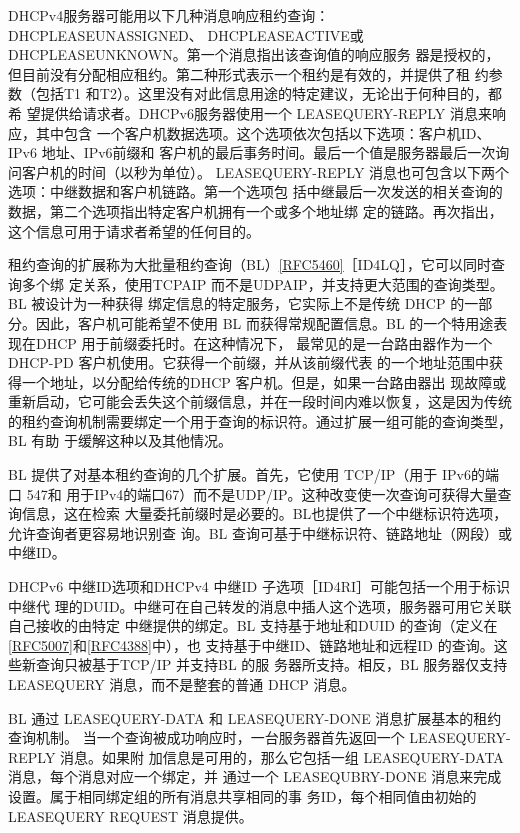 DHCPv4服务器可能用以下几种消息响应租约查询：DHCPLEASEUNASSIGNED、
DHCPLEASEACTIVE或 DHCPLEASEUNKNOWN。第一个消息指出该查询值的响应服务
器是授权的，但目前没有分配相应租约。第二种形式表示一个租约是有效的，并提供了租
约参数（包括T1 和T2）。这里没有对此信息用途的特定建议，无论出于何种目的，都希
望提供给请求者。DHCPv6服务器使用一个 LEASEQUERY-REPLY 消息来响应，其中包含
一个客户机数据选项。这个选项依次包括以下选项：客户机ID、IPv6 地址、IPv6前缀和
客户机的最后事务时间。最后一个值是服务器最后一次询问客户机的时间（以秒为单位）。
LEASEQUERY-REPLY 消息也可包含以下两个选项：中继数据和客户机链路。第一个选项包
括中继最后一次发送的相关查询的数据，第二个选项指出特定客户机拥有一个或多个地址绑
定的链路。再次指出，这个信息可用于请求者希望的任何目的。

租约查询的扩展称为大批量租约查询（BL）\href{https://www.rfc-editor.org/rfc/rfc5460}{\href{https://www.rfc-editor.org/rfc/rfc5460}{[RFC5460]}}［ID4LQ］，它可以同时查询多个绑
定关系，使用TCPAIP 而不是UDPAIP，并支持更大范围的查询类型。BL 被设计为一种获得
绑定信息的特定服务，它实际上不是传统 DHCP 的一部分。因此，客户机可能希望不使用
BL 而获得常规配置信息。BL 的一个特用途表现在DHCP 用于前缀委托时。在这种情况下，
最常见的是一台路由器作为一个 DHCP-PD 客户机使用。它获得一个前缀，并从该前缀代表
的一个地址范围中获得一个地址，以分配给传统的DHCP 客户机。但是，如果一台路由器出
现故障或重新启动，它可能会丢失这个前缀信息，并在一段时间内难以恢复，这是因为传统
的租约查询机制需要绑定一个用于查询的标识符。通过扩展一组可能的查询类型，BL 有助
于缓解这种以及其他情况。

BL 提供了对基本租约查询的几个扩展。首先，它使用 TCP/IP（用于 IPv6的端口 547和
用于IPv4的端口67）而不是UDP/IP。这种改变使一次查询可获得大量查询信息，这在检索
大量委托前缀时是必要的。BL也提供了一个中继标识符选项，允许查询者更容易地识别查
询。BL 查询可基于中继标识符、链路地址（网段）或中继ID。

DHCPv6 中继ID选项和DHCPv4 中继ID 子选项［ID4RI］可能包括一个用于标识中继代
理的DUID。中继可在自己转发的消息中插人这个选项，服务器可用它关联自己接收的由特定
中继提供的绑定。BL 支持基于地址和DUID 的查询（定义在\href{https://www.rfc-editor.org/rfc/rfc5007}{\href{https://www.rfc-editor.org/rfc/rfc5007}{[RFC5007]}}和\href{https://www.rfc-editor.org/rfc/rfc4388}{\href{https://www.rfc-editor.org/rfc/rfc4388}{[RFC4388]}}中），也
支持基于中继ID、链路地址和远程ID 的查询。这些新查询只被基于TCP/IP 并支持BL 的服
务器所支持。相反，BL 服务器仅支持 LEASEQUERY 消息，而不是整套的普通 DHCP 消息。

BL 通过 LEASEQUERY-DATA 和 LEASEQUERY-DONE 消息扩展基本的租约查询机制。
当一个查询被成功响应时，一台服务器首先返回一个 LEASEQUERY-REPLY 消息。如果附
加信息是可用的，那么它包括一组 LEASEQUERY-DATA 消息，每个消息对应一个绑定，并
通过一个 LEASEQUBRY-DONE 消息来完成设置。属于相同绑定组的所有消息共享相同的事
务ID，每个相同值由初始的 LEASEQUERY REQUEST 消息提供。

